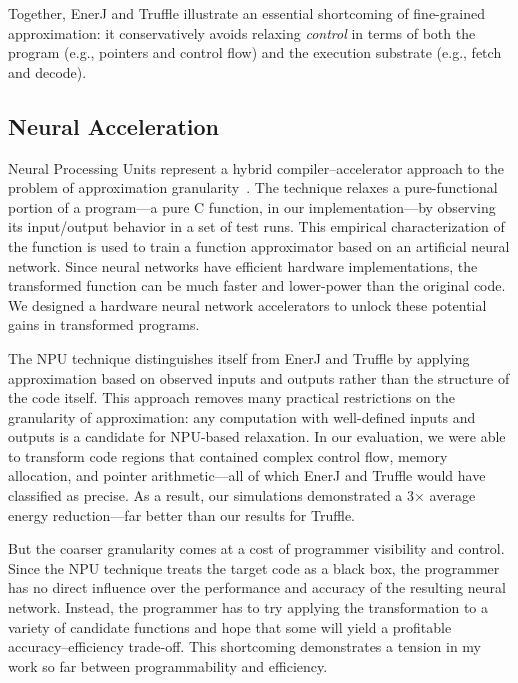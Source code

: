 Together, EnerJ and Truffle illustrate an essential shortcoming of
fine-grained approximation: it conservatively avoids relaxing \emph{control}
in terms of both the program (e.g., pointers and control flow) and the
execution substrate (e.g., fetch and decode).


\subsection{Neural Acceleration}

Neural Processing Units represent a hybrid compiler--accelerator approach to
the problem of approximation granularity~\cite{npu}. The technique relaxes a
pure-functional portion of a program---a pure C function, in our
implementation---by observing its input/output behavior in a set of test runs.
This empirical characterization of the function is used to train a function
approximator based on an artificial neural network. Since neural networks have
efficient hardware implementations, the transformed function can be much
faster and lower-power than the original code. We designed a hardware neural
network accelerators to unlock these potential gains in transformed programs.

The NPU technique distinguishes itself from EnerJ and Truffle by applying
approximation based on observed inputs and outputs rather than the structure
of the code itself. This approach removes many practical restrictions on the
granularity of approximation: any computation with well-defined inputs and
outputs is a candidate for NPU-based relaxation. In our evaluation, we were
able to transform code regions that contained complex control flow, memory
allocation, and pointer arithmetic---all of which EnerJ and Truffle would have
classified as precise. As a result, our simulations demonstrated a 3$\times$
average energy reduction---far better than our results for Truffle.

But the coarser granularity comes at a cost of programmer visibility and
control. Since the NPU technique treats the target code as a black box, the
programmer has no direct influence over the performance and accuracy of the
resulting neural network. Instead, the programmer has to try applying the
transformation to a variety of candidate functions and hope that some will
yield a profitable accuracy--efficiency trade-off.
This shortcoming demonstrates a tension in my work so far between
programmability and efficiency.

